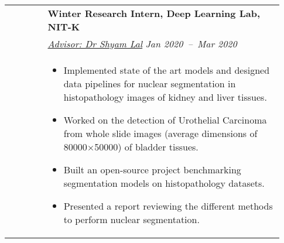 \documentclass[letterpaper, 10pt, oneside]{article}
\newcommand{\bdit}[1]{{\textbf{#1}}}
\begin{document}
\begin{longtable}{@{} p{0.13\linewidth} p{0.8\linewidth}}
                         & \bdit{Winter Research Intern, Deep Learning Lab, NIT-K}                                                                                                                                                           \\
                         & \textsl{\href{https://ece.nitk.ac.in/faculty/shyam-lal}{Advisor: Dr Shyam Lal}} \hfill \hspace{-3em} \textsl{Jan 2020\ --\ Mar 2020}                                                                              \\
                         & \parbox{0.8\textwidth}{                                                                                                                                                                                           %
        \begin{itemize}[leftmargin=*, itemsep=-0.88ex, topsep=-0.88ex]
            \item Implemented state of the art models and designed data pipelines for nuclear segmentation in histopathology images of kidney and liver tissues.
            \item Worked on the detection of Urothelial Carcinoma from whole slide images (average dimensions of 80000$\times$50000) of bladder tissues.
            \item Built an open-source project benchmarking segmentation models on histopathology datasets.
            \item Presented a report reviewing the different methods to perform nuclear segmentation.
        \end{itemize}
    }
    \\
    \\


\end{longtable}
\end{document}
